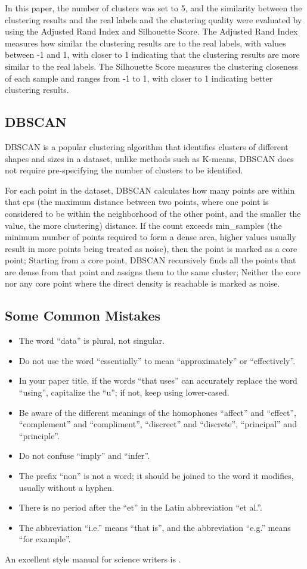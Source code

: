 \documentclass[conference]{IEEEtran}
\begin{document}
	In this paper, the number of clusters was set to 5, and the similarity between the clustering results and the real labels and the clustering quality were evaluated by using the Adjusted Rand Index and Silhouette Score. The Adjusted Rand Index measures how similar the clustering results are to the real labels, with values between -1 and 1, with closer to 1 indicating that the clustering results are more similar to the real labels. The Silhouette Score measures the clustering closeness of each sample and ranges from -1 to 1, with closer to 1 indicating better clustering results.
	
	\subsection{DBSCAN}\label{AA}
	DBSCAN is a popular clustering algorithm that identifies clusters of different shapes and sizes in a dataset, unlike methods such as K-means, DBSCAN does not require pre-specifying the number of clusters to be identified.
	
	For each point in the dataset, DBSCAN calculates how many points are within that eps (the maximum distance between two points, where one point is considered to be within the neighborhood of the other point, and the smaller the value, the more clustering) distance. If the count exceeds min\_samples (the minimum number of points required to form a dense area, higher values usually result in more points being treated as noise), then the point is marked as a core point; Starting from a core point, DBSCAN recursively finds all the points that are dense from that point and assigns them to the same cluster; Neither the core nor any core point where the direct density is reachable is marked as noise.
	
	\subsection{Some Common Mistakes}\label{SCM}
	\begin{itemize}
		\item The word ``data'' is plural, not singular.
		\item Do not use the word ``essentially'' to mean ``approximately'' or ``effectively''.
		\item In your paper title, if the words ``that uses'' can accurately replace the word ``using'', capitalize the ``u''; if not, keep using lower-cased.
		\item Be aware of the different meanings of the homophones ``affect'' and ``effect'', ``complement'' and ``compliment'', ``discreet'' and ``discrete'', ``principal'' and ``principle''.
		\item Do not confuse ``imply'' and ``infer''.
		\item The prefix ``non'' is not a word; it should be joined to the word it modifies, usually without a hyphen.
		\item There is no period after the ``et'' in the Latin abbreviation ``et al.''.
		\item The abbreviation ``i.e.'' means ``that is'', and the abbreviation ``e.g.'' means ``for example''.
	\end{itemize}
	An excellent style manual for science writers is \cite{b7}.
	
\end{document}
